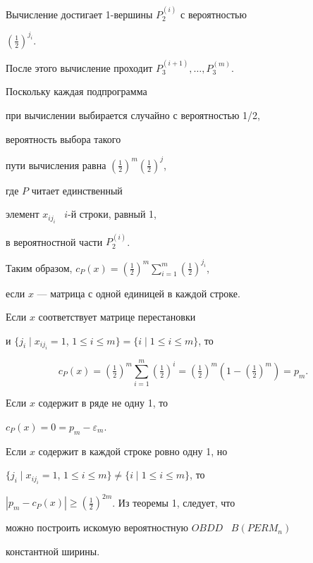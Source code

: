 \begin{pf}
Вычисление достигает 1-вер\-шины $P_2^{(i)}$ с вероятностью


$(\frac{1}{2})^{j_i}$.


После этого вычисление проходит $P_3^{(i+1)},\dotsc,P_3^{(m)}$.


Поскольку каждая подпрограмма


при вычислении выбирается случайно с вероятностью 1/2,


вероятность выбора такого


пути вычисления равна $(\frac{1}{2})^m(\frac{1}{2})^j$,


где $P$ читает единственный


элемент $x_{i{j_i}}$ \ $i$-й строки, равный 1,


в вероятностной части $P_2^{(i)}$.





Таким образом, $c_P(x)=(\frac{1}{2})^m\sum\limits_{i=1}^m(\frac{1}{2})^{j_i}$,


если $x$ --- матрица с одной единицей в каждой строке.


Если $x$ соответствует матрице перестановки


и $\{j_i\mid x_{ij_i}=1$, $1\le i\le m\}=\{i\mid 1\le i\le m\}$, то


$$


c_P(x)=(\tfrac{1}{2})^m\sum_{i=1}^m(\tfrac{1}{2})^i=


(\tfrac{1}{2})^m(1-(\tfrac{1}{2})^m)=p_m.


$$





Если $x$ содержит в ряде не одну 1, то


$c_P(x)=0=p_m-\varepsilon_m$.





Если $x$ содержит в каждой строке ровно одну 1, но


$\{j_i\mid x_{ij_i}=1$, $1\le i\le m\}\ne\{i\mid 1\le i\le m\}$, то


$|p_m-c_P(x)|\ge(\frac{1}{2})^{2m}$. Из теоремы 1, следует, что


можно построить искомую вероятностную $OBDD$ \ $B(PERM_n)$


константной ширины.


\end{pf}








